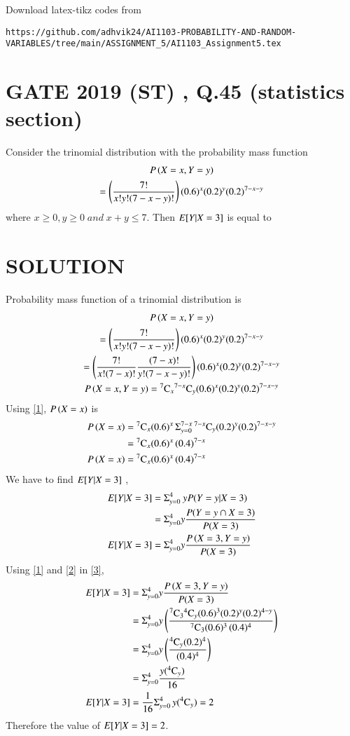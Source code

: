 \documentclass[journal,12pt,twocolumn]{IEEEtran}
\begin{document}
%
Download latex-tikz codes from 
%
\begin{lstlisting}
https://github.com/adhvik24/AI1103-PROBABILITY-AND-RANDOM-VARIABLES/tree/main/ASSIGNMENT_5/AI1103_Assignment5.tex
\end{lstlisting}
\section{GATE 2019 (ST) , Q.45 (statistics section)}
Consider the trinomial distribution with the probability mass function 
\begin{multline}
    \nonumber P\left(X={x} , Y={y}\right)\\=\left(\frac{7!}{x!y!(7-x-y)!}\right)(0.6)^x(0.2)^y(0.2)^{7-x-y}
\end{multline}
where $x\geq0 , y\geq0 \;and\; {x+y}\leq7$.
Then $E[ Y|X=3 ]$ is equal to
\section{SOLUTION}
Probability mass function of a trinomial distribution is
\begin{multline}
   P\left(X={x} , Y={y}\right) \\=\left(\frac{7!}{x!y!(7-x-y)!}\right)(0.6)^x(0.2)^y(0.2)^{7-x-y}\\
    =\left(\frac{7!}{x!(7-x)!}\frac{(7-x)!}{y!(7-x-y)!}\right)(0.6)^x(0.2)^y(0.2)^{7-x-y}\\
    P\left(X={x} , Y={y}\right)={}^{7}\mathrm{C}_{x}{}^{7-x}\mathrm{C}_{y}(0.6)^x(0.2)^y(0.2)^{7-x-y}\label{1}
\end{multline}
Using \eqref{1}, $P\left(X={x}\right)$ is 
\begin{align}
   \nonumber P\left(X={x}\right)&={}^{7}\mathrm{C}_{x}(0.6)^x\,\Sigma_{y=0}^{7-x}\, {}^{7-x}\mathrm{C}_{y} (0.2)^y(0.2)^{7-x-y} \\
  \nonumber  &={}^{7}\mathrm{C}_{x}(0.6)^x\,{(0.4)^{7-x}}\\
    P\left(X={x}\right)&={}^{7}\mathrm{C}_{x}(0.6)^x\,{(0.4)^{7-x}}\label{2}
\end{align}
We have to find $E[ Y|X=3 ]$ ,
\begin{align}
    E[ Y|X=3 ]&=\Sigma_{y=0}^4 \: y P(Y=y|X=3)\\
    &=\Sigma_{y=0}^4 y   \frac{P(Y=y\cap X=3)}{P(X=3)}\\
    E[ Y|X=3 ]&=\Sigma_{y=0}^4 y   \frac{ P\left(X={3} , Y={y}\right)}{P(X=3)} \label{3}
\end{align}
Using \eqref{1} and \eqref{2} in \eqref{3},
\begin{align}
   \nonumber E[ Y|X=3 ]&=\Sigma_{y=0}^4 y   \frac{ P\left(X={3} , Y={y}\right)}{P(X=3)}\\
  \nonumber  &=\Sigma_{y=0}^4 y   \left(\frac{{}^{7}\mathrm{C}_{3}{}^{4}\mathrm{C}_{y}(0.6)^3(0.2)^y(0.2)^{4-y}}{{}^{7}\mathrm{C}_{3}(0.6)^3\,{(0.4)^{4}}}\right)\\
 \nonumber &=\Sigma_{y=0}^4 y   \left(\frac{{}^{4}\mathrm{C}_{y}(0.2)^{4}}{{(0.4)^{4}}}\right)\\
 &=\Sigma_{y=0}^4 {\frac{y({}^{4}\mathrm{C}_{y})}{{16}}}\\
  E[ Y|X=3 ]&=\frac{1}{16}\Sigma_{y=0}^4\, {y({}^{4}\mathrm{C}_{y})}=2
\end{align}
Therefore the value of $E[ Y|X=3 ]=2$.
\end{document}
